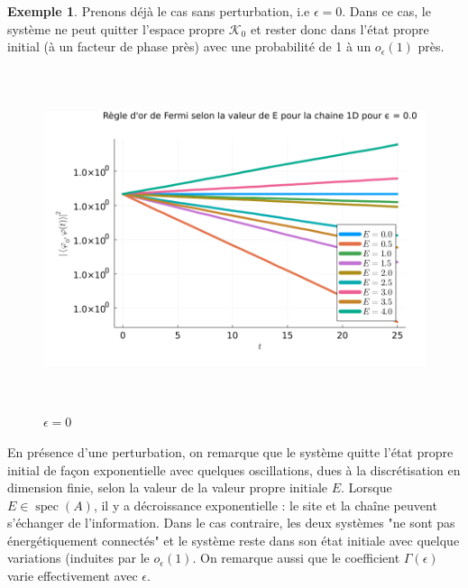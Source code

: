 \documentclass[12pt,openany,a4paper, titlepage]{article}
\newcommand{\spec}{\operatorname{spec}}
\theoremstyle{definition}
\theoremstyle{definition}
\theoremstyle{definition}
\newtheorem{ex}{Exemple}
\theoremstyle{definition}
\theoremstyle{definition}
\theoremstyle{definition}
\begin{document}
\begin{ex}
Prenons déjà le cas sans perturbation, i.e $\epsilon = 0$. Dans ce cas, le système ne peut quitter l'espace propre $\mathcal{K}_0$ et rester donc dans l'état propre initial (à un facteur de phase près) avec une probabilité de 1 à un $o_\epsilon(1)$ près.\\


\begin{figure}[h]
    \centering
        \includegraphics[height=10cm]{Règle d'or de Fermi pour la chaine 1D pour ϵ = 0.png}
        \caption{$\epsilon = 0$}
\end{figure}

En présence d'une perturbation, on remarque que le système quitte l'état propre initial de façon exponentielle avec quelques oscillations, dues à la discrétisation en dimension finie, selon la valeur de la valeur propre initiale $E$. Lorsque $E\in\spec(A)$, il y a décroissance exponentielle : le site et la chaîne peuvent s'échanger de l'information. Dans le cas contraire, les deux systèmes "ne sont pas énergétiquement connectés" et le système reste dans son état initiale avec quelque variations (induites par le $o_\epsilon(1)$. On remarque aussi que le coefficient $\Gamma(\epsilon)$ varie effectivement avec $\epsilon$.


\end{ex}
\end{document}
